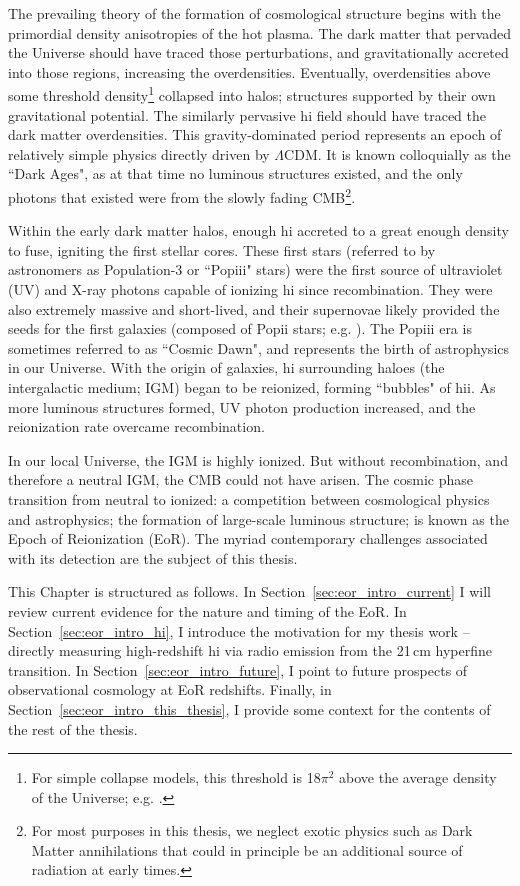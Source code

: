 The prevailing theory of the formation of cosmological structure begins with the primordial density anisotropies of the hot plasma. The dark matter that pervaded the Universe should have traced those perturbations, and gravitationally accreted into those regions, increasing the overdensities. Eventually, overdensities above some threshold density\footnote{For simple collapse models, this threshold is 18$\pi^2$ above the average density of the Universe; e.g. \citet{Press.74}.} collapsed into halos; structures supported by their own gravitational potential. The similarly pervasive {\sc hi} field should have traced the dark matter overdensities. This gravity-dominated period represents an epoch of relatively simple physics directly driven by $\Lambda$CDM. It is known colloquially as the ``Dark Ages", as at that time no luminous structures existed, and the only photons that existed were from the slowly fading CMB\footnote{For most purposes in this thesis, we neglect exotic physics such as Dark Matter annihilations that could in principle be an additional source of radiation at early times.}.

Within the early dark matter halos, enough {\sc hi} accreted to a great enough density to fuse, igniting the first stellar cores. These first stars (referred to by astronomers as Population-3 or ``Pop{\sc iii}" stars) were the first source of ultraviolet (UV) and X-ray photons capable of ionizing {\sc hi} since recombination. They were also extremely massive and short-lived, and their supernovae likely provided the seeds for the first galaxies (composed of Pop{\sc ii} stars; e.g. \citet{Ricotti.16}). The Pop{\sc iii} era is sometimes referred to as ``Cosmic Dawn", and represents the birth of astrophysics in our Universe. With the origin of galaxies, {\sc hi} surrounding haloes (the intergalactic medium; IGM) began to be reionized, forming ``bubbles" of {\sc hii}. As more luminous structures formed, UV photon production increased, and the reionization rate overcame recombination.

In our local Universe, the IGM is highly ionized. But without recombination, and therefore a neutral IGM, the CMB could not have arisen. The cosmic phase transition from neutral to ionized: a competition between cosmological physics and astrophysics; the formation of large-scale luminous structure; is known as the Epoch of Reionization (EoR). The myriad contemporary challenges associated with its detection are the subject of this thesis.

This Chapter is structured as follows. In Section~\ref{sec:eor_intro_current} I will review current evidence for the nature and timing of the EoR. In Section~\ref{sec:eor_intro_hi}, I introduce the motivation for my thesis work -- directly measuring high-redshift {\sc hi} via radio emission from the 21\,cm hyperfine transition. In Section~\ref{sec:eor_intro_future}, I point to future prospects of observational cosmology at EoR redshifts. Finally, in Section~\ref{sec:eor_intro_this_thesis}, I provide some context for the contents of the rest of the thesis.

